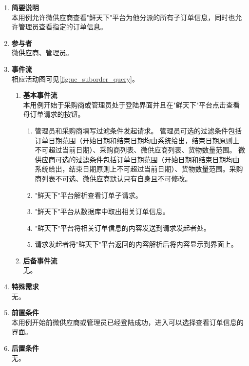\begin{enumerate}
    \item \textbf{简要说明}  \\ 本用例允许微供应商查看"鲜天下"平台为他分派的所有子订单信息，同时也允许管理员查看指定的订单信息。
    \item \textbf{参与者} \\ 微供应商、管理员。
    \item \textbf{事件流} \\ 相应活动图可见\autoref{fig:uc_suborder_query}。
    \begin{enumerate} 
        \item \textbf{基本事件流} \\ 本用例开始于采购商或管理员处于登陆界面并且在"鲜天下"平台点击查看母订单请求的按钮。
        \begin{enumerate}
            \item 管理员和采购商填写过滤条件发起请求。
            管理员可选的过滤条件包括订单日期范围（开始日期和结束日期均由系统给出，结束日期原则上不可超过当前日期）、采购商列表、微供应商列表、货物数量范围。
            微供应商可选的过滤条件包括订单日期范围（开始日期和结束日期均由系统给出，结束日期原则上不可超过当前日期）、货物数量范围。采购商列表不可选、微供应商默认只有自身且不可修改。

            \item "鲜天下"平台解析查看订单子请求。

            \item "鲜天下"平台从数据库中取出相关订单信息。

            \item "鲜天下"平台将相关订单信息的内容发送到请求发起者处。
            
            \item 请求发起者将"鲜天下"平台返回的内容解析后将内容显示到界面上。

        \end{enumerate}
        \item \textbf{后备事件流}  \\ 无。
        
    \end{enumerate}
    \item \textbf{特殊需求} \\ 无。
    \item \textbf{前置条件} \\ 本用例开始前微供应商或管理员已经登陆成功，进入可以选择查看订单信息的界面。
    \item \textbf{后置条件} \\ 无。
\end{enumerate}


